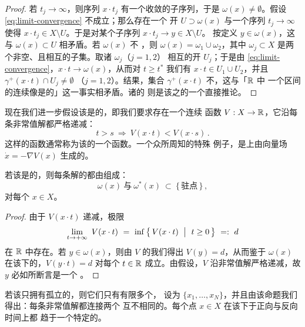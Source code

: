\begin{proof}
若 $t_{j}\to\infty$，则序列 $x\cdot t_{j}$ 有一个收敛的子序列，于是%
$\omega(x)\neq\emptyset$。假设 \eqref{eq:limit-convergence} 不成立；那么存在一个%
开\trNeighborhood{} $U\supset\omega(x)$ 与一个序列 $t_{j}\to\infty$ 使得%
$x\cdot t_{j}\in X\setminus U$。于是对某个子序列 $x\cdot t_{j}\to y\in X\setminus U$。%
按定义 $y\in\omega(x)$，这与 $\omega(x)\subset U$ 相矛盾。若 $\omega(x)$ 不%
\trConnected，则 $\omega(x)=\omega_{1}\cup\omega_{2}$，其中 $\omega_{j}\subset X$%
是两个非空、\trCompact{}且相互\trDisjoint{}的子集。取诸 $\omega_{j}$（$j=1,2$）%
相互\trDisjoint{}的开\trNeighborhood{} $U_{j}$；于是由%
\eqref{eq:limit-convergence}，$x\cdot t\to\omega(x)$，从而对 $t\geq t^{*}$ 我们有%
$x\cdot t\in U_{1}\cup U_{2}$，并且 $\gamma^{+}(x\cdot t)\cap U_{j}\neq\emptyset$%
（$j=1,2$）。结果，集合 $\gamma^{+}(x\cdot t)$ 不\trConnected，这与「$\mathbb{R}$ 中%
一个区间的连续像是\trConnected{}的」这一事实相矛盾。诸\trLimitSet{}的\trInvariance{}%
则是该\trFlow{}之\trContinuity{}的一个直接推论。
\end{proof}

现在我们进一步假设该\trFlow{}是\trGradientLike{}的，即我们要求存在一个连续%
函数 $V:X\to\mathbb{R}$，它沿每条非常值解都严格\trMonotone{}递减：
\[
t>s\ \Longrightarrow\ V(x\cdot t)<V(x\cdot s)\,.
\]
这样的函数通常称为该\trFlow{}的一个\trLyapunov{}函数。一个众所周知的特殊%
例子，是\trCompact{}\trRiemann\trManifold{}上由\trSmooth{}\trGradient{}向量场%
$\dot{x}=-\nabla V(x)$ 生成的\trFlow。

\begin{proposition}\label{prop:limit-rest-points}
若该\trFlow{}是\trGradientLike{}的，则每条解的\trLimitSet{}都由\trRestPoint{}组成：
\[
\omega(x)\ \text{与}\ \omega^{*}(x)\ \subset\ \{\,\text{驻点}\,\}\,,
\]
对每个 $x\in X$。
\end{proposition}

\begin{proof}
由于 $V(x\cdot t)$ \trMonotone{}递减，极限
\[
\lim_{t\to+\infty}\ V(x\cdot t)\ =\ \inf\,\bigl\{\,V(x\cdot t)\ \bigm|\ t\geq0\,\bigr\}\ =:\ d
\]
在 $\mathbb{R}$ 中存在。若 $y\in\omega(x)$，则由 $V$ 的\trContinuity{}我们得出%
$V(y)=d$，从而鉴于 $\omega(x)$ 在该\trFlow{}下的\trInvariance，$V(y\cdot t)=d$%
对每个 $t\in\mathbb{R}$ 成立。由假设，$V$ 沿非常值解严格递减，故 $y$ 必如所断言是一个%
\trRestPoint。
\end{proof}

若该\trGradientLike\trFlow{}只拥有孤立的\trRestPoint，则它们只有有限多个，%
设为 $\{x_{1},\ldots,x_{N}\}$，并且由该命题我们得出：每条非常值解都连接两个%
互不相同的\trRestPoint。每个点 $x\in X$ 在该\trFlow{}下于正向与反向时间上都%
趋于一个特定的\trRestPoint。

